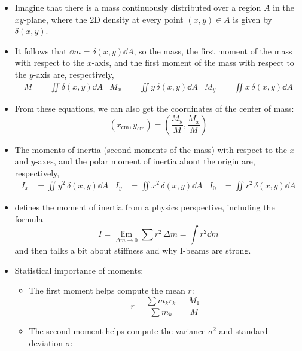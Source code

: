 \documentclass[../main.tex]{subfiles}
\begin{document}
\begin{itemize}
    \item Imagine that there is a mass continuously distributed over a region $A$ in the $xy$-plane, where the 2D density at every point $(x,y)\in A$ is given by $\delta(x,y)$.
    \item It follows that $\dd{m}=\delta(x,y)\dd{A}$, so the mass, the first moment of the mass with respect to the $x$-axis, and the first moment of the mass with respect to the $y$-axis are, respectively,
    \begin{align*}
        M &= \iint\delta(x,y)\dd{A}&
            M_x &= \iint y\, \delta(x,y)\dd{A}&
                M_y &= \iint x\, \delta(x,y)\dd{A}
    \end{align*}
    \item From these equations, we can also get the coordinates of the center of mass:
    \begin{equation*}
        (x_\text{cm},y_\text{cm}) = \left( \frac{M_y}{M},\frac{M_x}{M} \right)
    \end{equation*}
    \item The moments of inertia (second moments of the mass) with respect to the $x$- and $y$-axes, and the polar moment of inertia about the origin are, respectively,
    \begin{align*}
        I_x &= \iint y^2\, \delta(x,y)\dd{A}&
            I_y &= \iint x^2\, \delta(x,y)\dd{A}&
                I_0 &= \iint r^2\, \delta(x,y)\dd{A}
    \end{align*}
    \item \textcite{bib:Thomas} defines the moment of inertia from a physics perspective, including the formula
    \begin{equation*}
        I = \lim_{\Delta m\to 0}\sum r^2\, \Delta m = \int r^2\dd{m}
    \end{equation*}
    and then talks a bit about stiffness and why I-beams are strong.
    \item Statistical importance of moments:
    \begin{itemize}
        \item The first moment helps compute the mean $\bar{r}$:
        \begin{equation*}
            \bar{r} = \frac{\sum m_kr_k}{\sum m_k} = \frac{M_1}{M}
        \end{equation*}
        \item The second moment helps compute the variance $\sigma^2$ and standard deviation $\sigma$:
        \begin{equation*}

\end{equation*}
\end{itemize}
\end{itemize}
\end{document}
